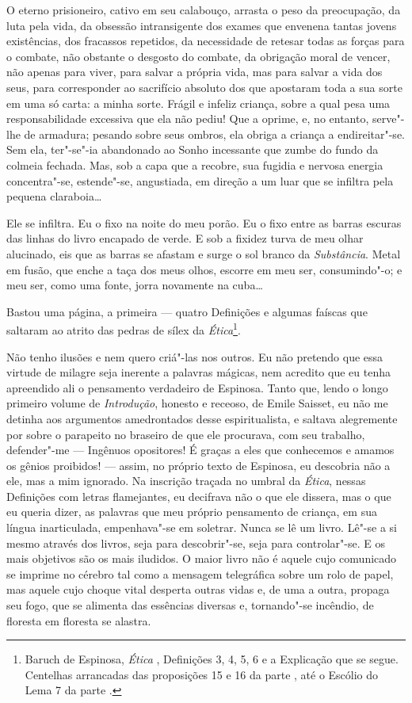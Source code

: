 O eterno prisioneiro, cativo em seu
calabouço, arrasta o peso da preocupação, da luta pela vida, da obsessão
intransigente dos exames que envenena tantas jovens existências, dos
fracassos repetidos, da necessidade de retesar todas as forças para o
combate, não obstante o desgosto do combate, da obrigação moral de
vencer, não apenas para viver, para salvar a própria vida, mas para
salvar a vida dos seus, para corresponder ao sacrifício absoluto dos que
apostaram toda a sua sorte em uma só carta: a minha sorte. Frágil e
infeliz criança, sobre a qual pesa uma responsabilidade excessiva que
ela não pediu! Que a oprime, e, no entanto, serve"-lhe de armadura;
pesando sobre seus ombros, ela obriga a criança a endireitar"-se. Sem
ela, ter"-se"-ia abandonado ao Sonho incessante que zumbe do fundo da
colmeia fechada. Mas, sob a capa que a recobre, sua fugidia e nervosa
energia concentra"-se, estende"-se, angustiada, em direção a um luar que
se infiltra pela pequena claraboia\ldots{}

\quebra

Ele se infiltra. Eu o fixo na noite do meu porão. Eu o fixo entre as
barras escuras das linhas do livro encapado de verde. E sob a fixidez
turva de
meu olhar alucinado, eis que as barras se afastam e surge o sol
branco da \emph{Substância}. Metal em fusão, que enche a taça dos meus
olhos, escorre em meu ser, consumindo"-o; e meu ser, como uma fonte,
jorra novamente na cuba\ldots{}

Bastou uma página, a primeira --- quatro Definições e algumas faíscas que
saltaram ao atrito das pedras de sílex da \emph{Ética}\footnote{Baruch
  de Espinosa, \emph{Ética} , Definições 3, 4, 5, 6 e a Explicação que
  se segue. Centelhas arrancadas das proposições 15 e 16 da parte , até
  o Escólio do Lema 7 da parte .}.

Não tenho ilusões e nem quero criá"-las nos outros. Eu não pretendo que
essa virtude de milagre seja inerente a palavras mágicas, nem acredito
que eu tenha apreendido ali o pensamento verdadeiro de Espinosa. Tanto
que, lendo o longo primeiro volume de \emph{Introdução}, honesto e
receoso, de Emile Saisset, eu não me detinha aos argumentos amedrontados
desse espiritualista, e saltava alegremente por sobre o parapeito no
braseiro de que ele procurava, com seu trabalho, defender"-me --- Ingênuos
opositores! É graças a eles que conhecemos e amamos os gênios proibidos!
--- assim, no próprio texto de Espinosa, eu descobria não a ele, mas a
mim ignorado. Na inscrição traçada no umbral da \emph{Ética}, nessas
Definições com letras flamejantes, eu decifrava não o que ele dissera,
mas o que eu queria dizer, as palavras que meu próprio pensamento de
criança, em sua língua inarticulada, empenhava"-se em soletrar. Nunca se
lê um livro. Lê"-se a si mesmo através dos livros, seja para
descobrir"-se, seja para controlar"-se. E os mais objetivos são os mais
iludidos. O maior livro não é aquele cujo comunicado se imprime no
cérebro tal como a mensagem telegráfica sobre um rolo de papel, mas
aquele cujo choque vital desperta outras vidas e, de uma a outra,
propaga seu fogo, que se alimenta das essências diversas e, tornando"-se
incêndio, de floresta em floresta se alastra.

